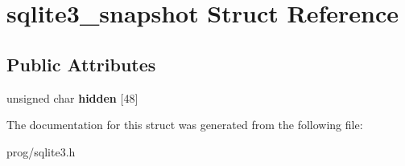 \hypertarget{structsqlite3__snapshot}{}\section{sqlite3\+\_\+snapshot Struct Reference}
\label{structsqlite3__snapshot}
\subsection*{Public Attributes}
\begin{DoxyCompactItemize}
\item 
\mbox{\label{structsqlite3__snapshot_aeed328b50a9580e9a91d0bf10612be4e}} 
unsigned char {\bfseries hidden} \mbox{[}48\mbox{]}
\end{DoxyCompactItemize}


The documentation for this struct was generated from the following file\+:\begin{DoxyCompactItemize}
\item 
prog/sqlite3.\+h\end{DoxyCompactItemize}
